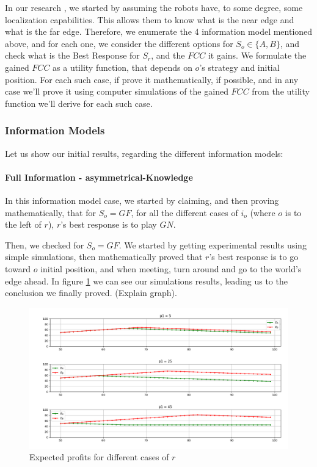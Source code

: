 \documentclass[a4paper,english,10pt]{article}
\newcommand\rob{\ensuremath{r}\xspace}
\newcommand\opp{\ensuremath{o}\xspace}
\newcommand{\fcc}{\ensuremath{FCC}\xspace}
\newcommand{\gn}{\ensuremath{GN}\xspace}
\newcommand{\gf}{\ensuremath{GF}\xspace}
\begin{document}
In our research , we started by assuming the robots have, to some degree, some localization capabilities. This allows them to know what is the near edge and what is the far edge.
Therefore, we enumerate the 4 information model mentioned above, and for each one, we consider the different options for $S_\opp\in \lbrace A,B\rbrace$, and check what is the Best Response for $S_\rob$, and the \fcc it gains. We formulate the gained \fcc as a utility function, that depends on \opp's strategy and initial position.
For each such case, if prove it mathematically, if possible, and in any case we'll prove it using computer simulations of the gained \fcc from the utility function we'll derive for each such case.


\subsubsection{Information Models}
Let us show our initial results, regarding the different information models:
\paragraph{Full Information - asymmetrical-Knowledge}
In this information model case, we started by claiming, and then proving mathematically, that for $S_\opp = \gf$, for all the different cases of $i_\opp$ (where \opp is to the left of \rob), \rob's best response is to play $\gn$.

Then, we checked for $S_\opp = \gf$. We started by getting experimental results using simple simulations, then mathematically proved that \rob's best response is to go toward \opp initial position, and when meeting, turn around and go to the world's edge ahead.
In figure \ref{figures:1D,partial,FullInfo,B case} we can see our simulations results, leading us to the conclusion we finally proved. (Explain graph).
\begin{figure}[H]
\includegraphics[width=\textwidth]{Images/GainedProfitp2SecondHalfWorld.png}
\caption{Expected profits for different cases of $r$}
\label{figures:1D,partial,FullInfo,B case}
\end{figure}
\end{document}
